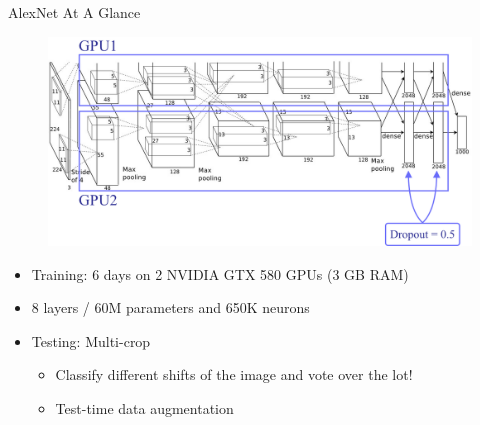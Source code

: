 \documentclass[serif, aspectratio=169]{beamer}
\begin{document}
\begin{frame}{AlexNet At A Glance}
	\begin{figure}[htpb]
		\begin{center}
			\includegraphics[keepaspectratio, scale=0.25]{pic/alexnet_annot}
		\end{center}
	\end{figure}
	\vspace{-0.2cm}
	\begin{itemize}
		\setlength{\itemsep}{-1.6pt}
		\item Training: 6 days on 2 NVIDIA GTX 580 GPUs (3 GB RAM)
		\item 8 layers / 60M parameters and 650K neurons
		\item Testing: Multi-crop
		\begin{itemize}
			\setlength{\itemsep}{-1.6pt}
			\item Classify different shifts of the image and vote over the lot!
			\item Test-time data augmentation
		\end{itemize}
	\end{itemize}
\end{frame}
\end{document}
